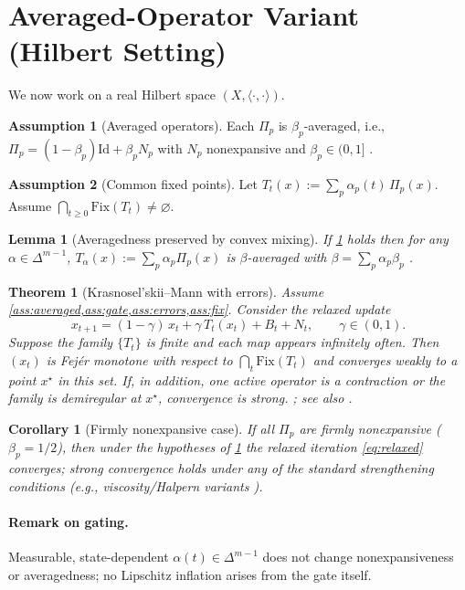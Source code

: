 \documentclass[11pt]{article}
\newtheorem{theorem}{Theorem}
\newtheorem{lemma}{Lemma}
\newtheorem{corollary}{Corollary}
\theoremstyle{definition}
\newtheorem{assumption}{Assumption}
\newcommand{\Id}{\mathrm{Id}}
\newcommand{\inner}[2]{\langle #1,#2\rangle}
\newcommand{\simplex}{\Delta}
\begin{document}
\section{Averaged-Operator Variant (Hilbert Setting)}
We now work on a real Hilbert space $(X,\inner{\cdot}{\cdot})$.
\begin{assumption}[Averaged operators]\label{ass:averaged}
Each $\Pi_p$ is $\beta_p$-averaged, i.e., $\Pi_p=(1-\beta_p)\Id+\beta_p N_p$ with $N_p$ nonexpansive and $\beta_p\in(0,1]$ \cite[Sec.~4.2]{BauschkeCombettes2017}.
\end{assumption}
\begin{assumption}[Common fixed points]\label{ass:fix}
Let $T_t(x):=\sum_p \alpha_p(t)\,\Pi_p(x)$. Assume $\bigcap_{t\ge0}\mathrm{Fix}(T_t)\neq\varnothing$.
\end{assumption}
\begin{lemma}[Averagedness preserved by convex mixing]\label{lem:avg-mix}
If \cref{ass:averaged} holds then for any $\alpha\in\simplex^{m-1}$, $T_\alpha(x):=\sum_p\alpha_p\Pi_p(x)$ is $\beta$-averaged with $\beta=\sum_p\alpha_p\beta_p$ \cite[Prop.~4.32]{BauschkeCombettes2017}.
\end{lemma}
\begin{theorem}[Krasnosel'skii--Mann with errors]\label{thm:km}
Assume \cref{ass:averaged,ass:gate,ass:errors,ass:fix}. Consider the relaxed update
\begin{equation}
\label{eq:relaxed}
x_{t+1}=(1-\gamma)\,x_t+\gamma\,T_t(x_t)+B_t+N_t,\qquad \gamma\in(0,1).
\end{equation}
Suppose the family $\{T_t\}$ is finite and each map appears infinitely often. Then $(x_t)$ is Fej\'er monotone with respect to $\bigcap_t\mathrm{Fix}(T_t)$ and converges weakly to a point $x^\star$ in this set. If, in addition, one active operator is a contraction or the family is demiregular at $x^\star$, convergence is strong. \cite[Thm.~5.14, Cor.~5.15]{BauschkeCombettes2017}; see also \cite{Mann1953,CombettesPesquet2015}.
\end{theorem}
\begin{corollary}[Firmly nonexpansive case]
If all $\Pi_p$ are firmly nonexpansive ($\beta_p=1/2$), then under the hypotheses of \cref{thm:km} the relaxed iteration \eqref{eq:relaxed} converges; strong convergence holds under any of the standard strengthening conditions (e.g., viscosity/Halpern variants \cite[Sec.~5.2]{BauschkeCombettes2017}).
\end{corollary}

\paragraph{Remark on gating.} Measurable, state-dependent $\alpha(t)\in\simplex^{m-1}$ does not change nonexpansiveness or averagedness; no Lipschitz inflation arises from the gate itself.
\end{document}
